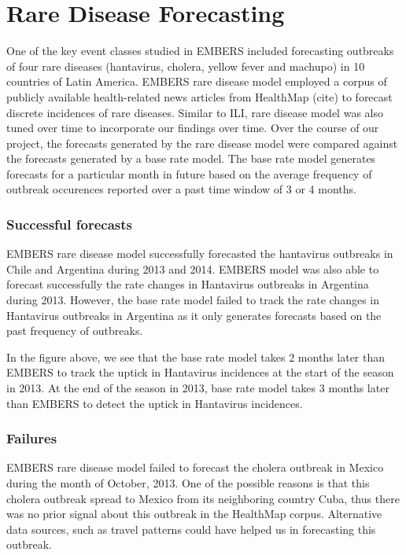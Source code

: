 \section{Rare Disease Forecasting}

One of the key event classes studied in EMBERS included forecasting outbreaks of four rare diseases (hantavirus, cholera, yellow fever and machupo) in 10 countries of Latin America. EMBERS rare disease model employed a corpus of publicly available health-related news articles from HealthMap (cite) to forecast discrete incidences of rare diseases. Similar to ILI, rare disease model was also tuned over time to incorporate our findings over time. Over the course of our project, the forecasts generated by the rare disease model were compared against the forecasts generated by a base rate model. The base rate model generates forecasts for a particular month in future based on the average frequency of outbreak occurences reported over a past time window of 3 or 4 months.


\subsubsection{Successful forecasts}

EMBERS rare disease model successfully forecasted the hantavirus outbreaks in Chile and Argentina during 2013 and 2014. EMBERS model was also able to forecast successfully the rate changes in Hantavirus outbreaks in Argentina during 2013. However, the base rate model failed to track the rate changes in Hantavirus outbreaks in Argentina as it only generates forecasts based on the past frequency of outbreaks. 


In the figure above, we see that the base rate model takes 2 months later than EMBERS to track the uptick in Hantavirus incidences at the start of the season in 2013. At the end of the season in 2013, base rate model takes 3 months later than EMBERS to detect the uptick in Hantavirus incidences. 


\subsubsection{Failures}

EMBERS rare disease model failed to forecast the cholera outbreak in Mexico during the month of October, 2013. One of the possible reasons is that this cholera outbreak spread to Mexico from its neighboring country Cuba, thus there was no prior signal about this outbreak in the HealthMap corpus. Alternative data sources, such as travel patterns could have helped us in forecasting this outbreak.
